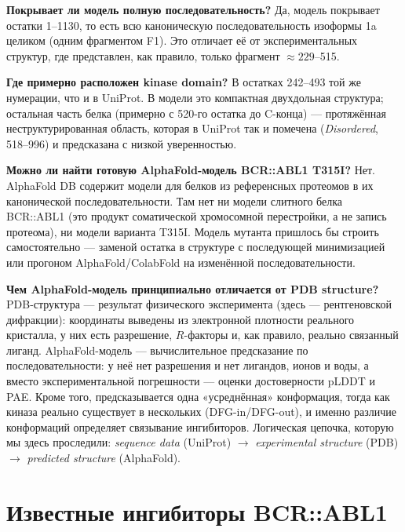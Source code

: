 \documentclass[12pt,a4paper]{article}
\begin{document}
\medskip
\textbf{Покрывает ли модель полную последовательность?} Да, модель покрывает остатки
1--1130, то есть всю каноническую последовательность изоформы 1a целиком (одним
фрагментом F1). Это отличает её от экспериментальных структур, где представлен, как
правило, только фрагмент ${\approx}229$--515.

\medskip
\textbf{Где примерно расположен kinase domain?} В остатках 242--493 той же нумерации,
что и в UniProt. В модели это компактная двухдольная структура; остальная часть белка
(примерно с 520-го остатка до C-конца) --- протяжённая неструктурированная область,
которая в UniProt так и помечена (\emph{Disordered}, 518--996) и предсказана с низкой
уверенностью.

\medskip
\textbf{Можно ли найти готовую AlphaFold-модель BCR::ABL1 T315I?} Нет. AlphaFold DB
содержит модели для белков из референсных протеомов в их канонической
последовательности. Там нет ни модели слитного белка BCR::ABL1 (это продукт
соматической хромосомной перестройки, а не запись протеома), ни модели варианта T315I.
Модель мутанта пришлось бы строить самостоятельно --- заменой остатка в структуре
с последующей минимизацией или прогоном AlphaFold/ColabFold на изменённой
последовательности.

\medskip
\textbf{Чем AlphaFold-модель принципиально отличается от PDB structure?}
PDB-структура --- результат физического эксперимента (здесь --- рентгеновской
дифракции): координаты выведены из электронной плотности реального кристалла, у них
есть разрешение, $R$-факторы и, как правило, реально связанный лиганд. AlphaFold-модель ---
вычислительное предсказание по последовательности: у неё нет разрешения и нет лигандов,
ионов и воды, а вместо экспериментальной погрешности --- оценки достоверности pLDDT и
PAE. Кроме того, предсказывается одна «усреднённая» конформация, тогда как киназа
реально существует в нескольких (DFG-in/DFG-out), и именно различие конформаций
определяет связывание ингибиторов. Логическая цепочка, которую мы здесь проследили:
\emph{sequence data} (UniProt) $\rightarrow$ \emph{experimental structure} (PDB)
$\rightarrow$ \emph{predicted structure} (AlphaFold).

\section{Известные ингибиторы BCR::ABL1}
\end{document}
